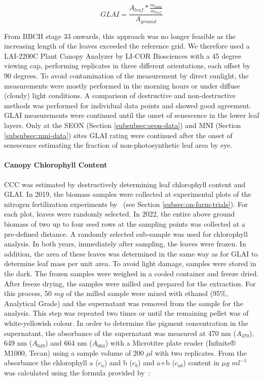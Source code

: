 \begin{equation}
    \label{eq:destructive-glai}
    GLAI = \frac{A_{leaf} * \frac{m_{total}}{m_{leaf}}}{A_{ground}}
\end{equation}

From BBCH stage 33 onwards, this approach was no longer feasible as the increasing length of the leaves exceeded the reference grid. We therefore used a LAI-2200C Plant Canopy Analyzer by LI-COR Biosciences with a 45 degree viewing cap, performing replicates in three different orientations, each offset by 90 degrees. To avoid contamination of the measurement by direct sunlight, the measurements were mostly performed in the morning hours or under diffuse (cloudy) light conditions. A comparison of destructive and non-destructive methods was performed for individual data points and showed good agreement. GLAI measurements were continued until the onset of senescence in the lower leaf layers. Only at the SEON (Section \ref{subsubsec:seon-data}) and MNI (Section \ref{subsubsec:mni-data}) sites GLAI rating were continued after the onset of senescence estimating the fraction of non-photosynthetic leaf area by eye.

\paragraph{Canopy Chlorophyll Content}
CCC was estimated by destructively determining leaf chlorophyll content and GLAI. In 2019, the biomass samples were collected at experimental plots of the nitrogen fertilization experiments by~\cite{argento_investigating_2022} (see Section \ref{subsec:on-farm-trials}). For each plot, leaves were randomly selected. In 2022, the entire above ground biomass of two up to four seed rows at the sampling points was collected at a pre-defined distance. A randomly selected sub-sample was used for chlorophyll analysis. In both years, immediately after sampling, the leaves were frozen. In addition, the area of these leaves was determined in the same way as for GLAI to determine leaf mass per unit area. To avoid light damage, samples were stored in the dark. The frozen samples were weighed in a cooled container and freeze dried. After freeze drying, the samples were milled and prepared for the extraction. For this process, 50 $mg$ of the milled sample were mixed with ethanol (95\%, Analytical Grade) and the supernatant was removed from the sample for the analysis. This step was repeated two times or until the remaining pellet was of white-yellowish colour. In order to determine the pigment concentration in the supernatant, the absorbance of the supernatant was measured at 470 nm ($A_{470}$), 649 nm ($A_{649}$) and 664 nm ($A_{664}$) with a Microtitre plate reader (Infinite® M1000, Tecan) using a sample volume of 200 $\mu l$ with two replicates. From the absorbance the chlorophyll a ($c_a$) and b ($c_b$) and a+b ($c_{ab}$) content in $\mu g$ $ml^{-1}$ was calculated using the formula provided by~\citet{lichtenthaler_chlorophylls_2001}:

